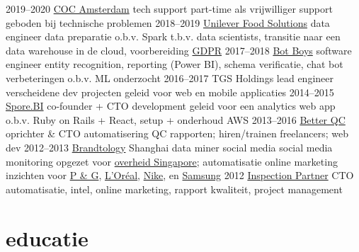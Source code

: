 \documentclass[]{friggeri-cv}
\begin{document}
\begin{entrylist}
  \entry
    {2019–2020}
    {\href{https://www.cocamsterdam.nl/}{COC Amsterdam}}
    {tech support}
    {part-time als vrijwilliger support geboden bij technische problemen}
  \entry
    {2018–2019}
    {\href{https://www.unileverfoodsolutions.com/}{Unilever Food Solutions}}
    {data engineer}
    {data preparatie o.b.v. Spark t.b.v. data scientists, transitie naar een data warehouse in de cloud, voorbereiding \href{https://www.eugdpr.org/}{GDPR}}
  \entry
    {2017–2018}
    {\href{https://www.botboys.com/en/welcome/}{Bot Boys}}
    {software engineer}
    {entity recognition, reporting (Power BI), schema verificatie, chat bot verbeteringen o.b.v. ML onderzocht}
  \entry
    {2016–2017}
    {TGS Holdings}
    {lead engineer}
    {verscheidene dev projecten geleid voor web en mobile applicaties}
  \entry
    {2014–2015}
    {\href{http://sporebi.com/}{Spore.BI}}
    {co-founder + CTO}
    {development geleid voor een analytics web app o.b.v. Ruby on Rails + React, setup + onderhoud AWS}
  \entry
    {2013–2016}
    {\href{http://betterqc.com/}{Better QC}}
    {
      oprichter
      \& CTO}
    {
      automatisering QC rapporten; hiren/trainen freelancers; web dev
    }
  \entry
    {2012–2013}
    {\href{http://www.isentia.com.sg/services/brandtology-social-media}{Brandtology} Shanghai}
    {data miner social media}
    {
      social media monitoring opgezet voor \href{https://www.gov.sg/}{overheid Singapore}; automatisatie online marketing inzichten voor
      \href{https://www.pg.com/}{P \& G},
      \href{http://www.loreal.com/}{L'Oréal},
      \href{https://www.nike.com/}{Nike},
      en
      \href{http://samsung.com/}{Samsung}
    }
  \entry
    {2012}
    {\href{http://www.inspectionpartnerasia.com/}{Inspection Partner}}
    {CTO}
    {automatisatie, intel, online marketing, rapport kwaliteit, project management}
\end{entrylist}

\section{educatie}
\end{document}
